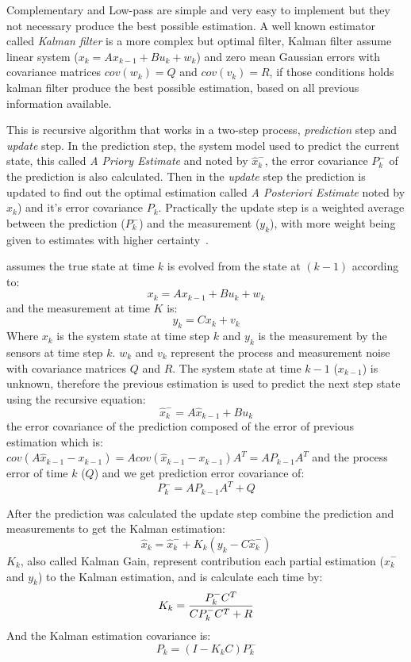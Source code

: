 \documentclass[ twoside, 12pt ]{article}
\begin{document}
Complementary and Low-pass are simple and very easy to implement but they not necessary produce the best possible estimation.
A well known estimator called \textit{Kalman filter} is a more complex but optimal filter, Kalman filter assume linear system ($x_{k}=Ax_{k-1} + Bu_{k} + w_{k}$) and zero mean Gaussian errors with covariance matrices $cov(w_k)=Q$ and $cov(v_k)=R$, if those conditions holds kalman filter produce the best possible estimation, based on all previous information available.

This is recursive algorithm that works in a two-step process, \textit{prediction} step and \textit{update} step. 
In the prediction step, the system model used to predict the current state, this called \textit{A Priory Estimate} and noted by $\hat{x}_k^-$,
the error covariance $P_k^-$ of the prediction is also calculated.
Then in the \textit{update} step the prediction is updated to find out the optimal estimation called \textit{A Posteriori Estimate} noted by $\hat{x}_k$) and it's error covariance $P_k$.
Practically the update step is a weighted average between the prediction ($P_k^-$) and the measurement ($y_k$), with more weight being given to estimates with higher certainty~\cite{Kalman-filter}. 

assumes the true state at time $k$ is evolved from the state at $(k − 1)$ according to:
$$x_{k}=Ax_{k-1} + Bu_{k} + w_{k}$$
and the measurement at time $K$ is:
$$y_k=Cx_k+v_k$$
Where $x_k$ is the system state at time step $k$ and $y_k$ is the measurement by the sensors at time step $k$.
$w_k$ and $v_k$ represent the process and measurement noise with covariance matrices $Q$ and $R$.
The system state at time $k-1$ ($x_{k-1}$) is unknown, therefore the previous estimation is used to predict the next step state using the recursive equation:
$$ \hat{x}_{k}^-=A\hat{x}_{k-1} + Bu_{k} $$
the error covariance of the prediction composed of the error of previous estimation which is:
$cov(A\hat{x}_{k-1} - x_{k-1}) = A cov(\hat{x}_{k-1} - x_{k-1}) A^T=A P_{k-1} A^T$
and the process error of time $k$ ($Q$) and we get prediction error covariance of:
$$ P_k^- = A P_{k-1} A^T + Q $$

After the prediction was calculated the update step combine the prediction and measurements to get the Kalman estimation:
$$ \hat{x}_{k} = \hat{x}_{k}^- + K_k(y_k - C\hat{x}_{k}^-)$$
$K_k$, also called Kalman Gain, represent contribution each partial estimation ($\hat{x}_{k}^-$ and $y_k$) to the Kalman estimation, and is calculate each time by:
$$ K_k = {{P_k^- C^T} \over {C P_k^- C^T + R} }$$
And the Kalman estimation covariance is:
$$ P_k = (I - K_kC) P_k^- $$
\end{document}
